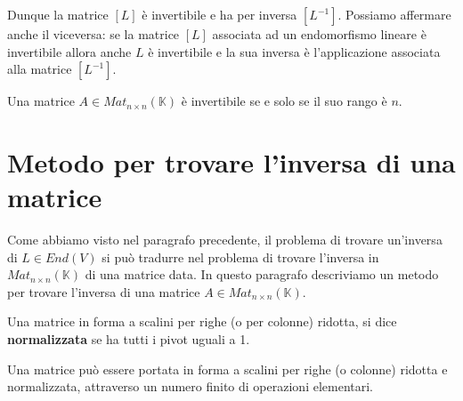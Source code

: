 Dunque la matrice $[L]$ \`e invertibile e ha per inversa $[L^{-1}]$.
Possiamo affermare anche il viceversa: se la matrice $[L]$ associata ad un
endomorfismo lineare \`e invertibile allora anche $L$ \`e invertibile e la sua
inversa \`e l'applicazione associata alla matrice $[L^{-1}]$.

\begin{corollary}
	Una matrice $A \in Mat_{n \times n}(\mathbb{K})$ \`e invertibile se e solo se
	il suo rango \`e $n$.
\end{corollary}

\section{Metodo per trovare l'inversa di una matrice}
Come abbiamo visto nel paragrafo precedente, il problema di trovare un'inversa
di $L \in End(V)$ si pu\`o tradurre nel problema di trovare l'inversa in
$Mat_{n \times n}(\mathbb{K})$ di una matrice data. In questo paragrafo descriviamo
un metodo per trovare l'inversa di una matrice $A \in Mat_{n \times n}(\mathbb{K})$.

\begin{defn}
	Una matrice in forma a scalini per righe (o per colonne) ridotta, si dice
	\textbf{normalizzata} se ha tutti i pivot uguali a 1.
\end{defn}

\begin{observation}
	Una matrice pu\`o essere portata in forma a scalini per righe (o colonne)
	ridotta e normalizzata, attraverso un numero finito di operazioni elementari.
\end{observation}

